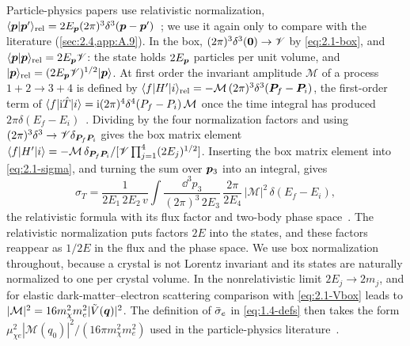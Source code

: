 Particle-physics papers use relativistic normalization, $\langle\bm{p}|\bm{p}'\rangle_{\mathrm{rel}} = 2E_{\bm{p}}(2\pi)^3\delta^3(\bm{p} - \bm{p}')$~\cite[Chap.~2]{peskin1995introduction}; we use it again only to compare with the literature (\cref{sec:2.4,app:A.9}). In the box, $(2\pi)^3\delta^3(\bm{0}) \to \mathscr{V}$ by \cref{eq:2.1-box}, and $\langle\bm{p}|\bm{p}\rangle_{\mathrm{rel}} = 2E_{\bm{p}}\mathscr{V}$: the state holds $2E_{\bm{p}}$ particles per unit volume, and $|\bm{p}\rangle_{\mathrm{rel}} = (2E_{\bm{p}}\mathscr{V})^{1/2}|\bm{p}\rangle$. At first order the invariant amplitude $\mathcal{M}$ of a process $1 + 2 \to 3 + 4$ is defined by $\langle f|H'|i\rangle_{\mathrm{rel}} = -\mathcal{M}\,(2\pi)^3\delta^3(\bm{P}_f - \bm{P}_i)$, the first-order term of $\langle f|\mathrm{i}\hat{T}|i\rangle = \mathrm{i}(2\pi)^4\delta^4(P_f - P_i)\,\mathcal{M}$ once the time integral has produced $2\pi\delta(E_f - E_i)$~\cite[Chap.~4]{peskin1995introduction}. Dividing by the four normalization factors and using $(2\pi)^3\delta^3 \to \mathscr{V}\delta_{\bm{P}_f\bm{P}_i}$ gives the box matrix element $\langle f|H'|i\rangle = -\mathcal{M}\,\delta_{\bm{P}_f\bm{P}_i}/[\mathscr{V}\prod_{j=1}^4(2E_j)^{1/2}]$. Inserting the box matrix element into \cref{eq:2.1-sigma}, and turning the sum over $\bm{p}_3$ into an integral, gives
\begin{equation*}
  \sigma_T = \frac{1}{2E_1\,2E_2\,v}\int\frac{\dd^3p_3}{(2\pi)^3\,2E_3}\,\frac{2\pi}{2E_4}\,|\mathcal{M}|^2\,\delta(E_f - E_i),
\end{equation*}
the relativistic formula with its flux factor and two-body phase space~\cite[Chap.~4]{peskin1995introduction}. The relativistic normalization puts factors $2E$ into the states, and these factors reappear as $1/2E$ in the flux and the phase space. We use box normalization throughout, because a crystal is not Lorentz invariant and its states are naturally normalized to one per crystal volume. In the nonrelativistic limit $2E_j \to 2m_j$, and for elastic dark-matter--electron scattering comparison with \cref{eq:2.1-Vbox} leads to $|\mathcal{M}|^2 = 16m_\chi^2m_e^2|\tilde V(\bm{q})|^2$. The definition of $\bar{\sigma}_{e}$ in \cref{eq:1.4-defs} then takes the form $\mu_{\chi e}^2|\mathcal{M}(q_0)|^2/(16\pi m_\chi^2m_e^2)$ used in the particle-physics literature~\cite[Eq.~(3)]{essig2012direct}.
